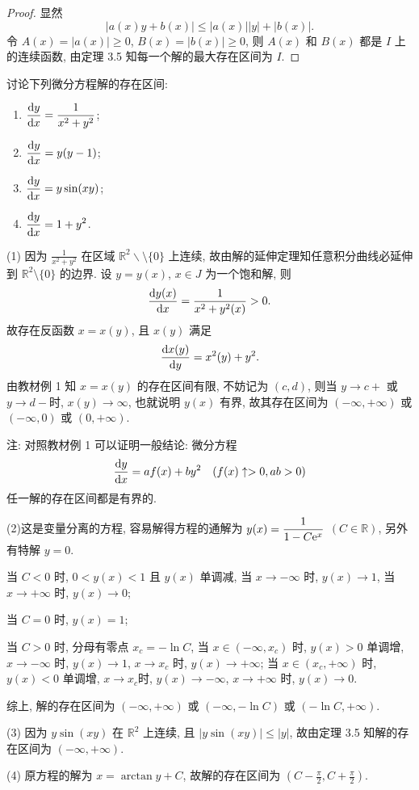 \begin{proof}
  显然
  \[|a(x)y+b(x)|\leq|a(x)||y|+|b(x)|.\]
  令 $A(x)=|a(x)|\geq 0$, $B(x)=|b(x)|\geq 0$,
  则 $A(x)$ 和 $B(x)$ 都是 $I$ 上的连续函数, 由定理 3.5 知每一个解的最大存在区间为 $I$.
\end{proof}



\begin{exercise}
  讨论下列微分方程解的存在区间:
  \begin{enumerate}[(1)]
  \item $\displaystyle\frac{\mathop{}\!\mathrm{d} y}{\mathop{}\!\mathrm{d} x}=\frac{1}{x^2+y^2}$;
  \item $\displaystyle\frac{\mathop{}\!\mathrm{d} y}{\mathop{}\!\mathrm{d} x}=y(y-1)$;
  \item $\displaystyle\frac{\mathop{}\!\mathrm{d} y}{\mathop{}\!\mathrm{d} x}=y\sin(xy)$;
  \item $\displaystyle\frac{\mathop{}\!\mathrm{d} y}{\mathop{}\!\mathrm{d} x}=1+y^2$.
  \end{enumerate}
\end{exercise}

\begin{solution}
  (1) 因为 $\frac{1}{x^2+y^2}$ 在区域 $\mathbb{R}^2\backslash\setminus\{0\}$ 上连续,
  故由解的延伸定理知任意积分曲线必延伸到 $\mathbb{R}^2\setminus\{0\}$ 的边界.
  设 $y=y(x)$, $x\in J$ 为一个饱和解, 则
  \[\frac{\mathop{}\!\mathrm{d} y(x)}{\mathop{}\!\mathrm{d} x}=\frac{1}{x^2+y^2(x)}>0.\]
  故存在反函数 $x=x(y)$, 且 $x(y)$ 满足
  \[\frac{\mathop{}\!\mathrm{d} x(y)}{\mathop{}\!\mathrm{d} y}=x^2(y)+y^2.\]
  由教材例 1 知 $x=x(y)$ 的存在区间有限, 不妨记为 $(c,d)$,
  则当 $y\to c+$ 或 $y\to d-$时, $x(y)\to\infty$, 也就说明 $y(x)$ 有界,
  故其存在区间为 $(-\infty,+\infty)$ 或 $(-\infty,0)$ 或 $(0,+\infty)$.

  注: 对照教材例 1 可以证明一般结论: 微分方程
  \[\frac{\mathop{}\!\mathrm{d} y}{\mathop{}\!\mathrm{d} x}=af(x)+by^2\quad (f(x)\uparrow>0,ab>0)\]
  任一解的存在区间都是有界的.

  (2)这是变量分离的方程, 容易解得方程的通解为
  $\displaystyle y(x)=\frac{1}{1-C\mathrm{e}^x}$ $(C\in\mathbb{R})$, 另外有特解 $y=0$.

  当 $C<0$ 时, $0<y(x)<1$ 且 $y(x)$ 单调减,
  当 $x\to-\infty$ 时, $y(x)\to 1$, 当 $x\to+\infty$ 时, $y(x)\to 0$;

  当 $C=0$ 时, $y(x)=1$;

  当 $C>0$ 时, 分母有零点 $x_c=-\ln C$, 当 $x\in(-\infty,x_c)$ 时, $y(x)>0$ 单调增,
  $x\to-\infty$ 时, $y(x)\to1$, $x\to x_c$ 时, $y(x)\to+\infty$;
  当 $x\in(x_c,+\infty)$ 时, $y(x)<0$ 单调增, $x\to x_c$时,
  $y(x)\to-\infty$, $x\to+\infty$ 时, $y(x)\to0$.

  综上, 解的存在区间为 $(-\infty,+\infty)$ 或 $(-\infty,-\ln C)$ 或 $(-\ln C,+\infty)$.

  (3) 因为 $y\sin(xy)$ 在 $\mathbb{R}^2$ 上连续,
  且 $|y\sin(xy)|\leq|y|$, 故由定理 3.5 知解的存在区间为 $(-\infty,+\infty)$.

  (4) 原方程的解为 $x=\arctan y+C$, 故解的存在区间为 $(C-\frac{\pi}{2},C+\frac{\pi}{2})$.
\end{solution}




